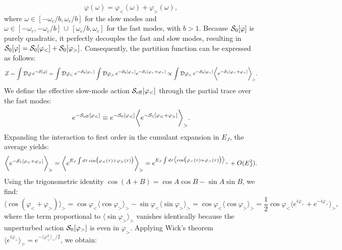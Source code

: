 \documentclass[aps,notitlepage,twocolumn,prl,nolongbibliography,superscriptaddress]{revtex4-2}
\begin{document}
\begin{equation}
    \varphi(\omega) = \varphi_<(\omega) + \varphi_>(\omega),
\end{equation}
where $\omega \in [-\omega_c/b, \omega_c/b]$ for the slow modes and $\omega \in [-\omega_c, -\omega_c/b]\, \cup \, [\omega_c/b, \omega_c]$ for the fast modes, with $b>1$.
Because ${\cal S}_0[\varphi]$ is purely quadratic, it perfectly decouples the fast and slow modes, resulting in ${\cal S}_0[\varphi] = {\cal S}_0[\varphi_<] + {\cal S}_0[\varphi_>]$. Consequently, the partition function can be expressed as follows:
\begin{equation}
    Z = \int {\cal D} \varphi \, e^{-{\cal S}[\varphi]} = \int {\cal D} \varphi_< \, e^{-{\cal S}_0[\varphi_<]} \int {\cal D} \varphi_> \, e^{-{\cal S}_0[\varphi_>]} e^{-{\cal S}_1[\varphi_< + \varphi_>]} \propto \int {\cal D} \varphi_< \, e^{-{\cal S}_0[\varphi_<]} \biggl \langle e^{-{\cal S}_1[\varphi_< + \varphi_>]} \biggr \rangle_>.
\end{equation}
We define the effective slow-mode action ${\cal S}_{\mathrm{eff}}[\varphi_<]$ through the partial trace over the fast modes:
\begin{equation}
     e^{-{\cal S}_{\mathrm{eff}}[\varphi_<]} \equiv e^{-{\cal S}_0[\varphi_<]} \biggl \langle e^{-{\cal S}_1[\varphi_< + \varphi_>]} \biggr \rangle_>.
\end{equation}
Expanding the interaction to first order in the cumulant expansion in $E_J$, the average yields:
\begin{equation}
      \biggl \langle e^{-{\cal S}_1[\varphi_< + \varphi_>]} \biggr \rangle_> = \biggl \langle e^{E_J\int d\tau \cos\bigl(\varphi_<(\tau) + \varphi_>(\tau)\bigr)}  \biggr \rangle_> = e^{E_J\int d\tau \bigl\langle\cos\bigl(\varphi_<(\tau) + \varphi_>(\tau)\bigr)\bigr \rangle_>} + O(E^2_J).
\end{equation}
Using the trigonometric identity $\cos(A+B) = \cos A\cos B - \sin A\sin B$, we find:
\begin{equation}
    \bigl \langle \cos(\varphi_< + \varphi_>)  \bigr \rangle_> = \cos \varphi_< \langle \cos\varphi_> \rangle_> - \sin \varphi_< \langle \sin\varphi_>   \rangle_> =  \cos \varphi_< \langle \cos\varphi_> \rangle_> = \frac{1}{2}\cos \varphi_< \biggl\langle e^{i\varphi_>} + e^{-i\varphi_>} \biggr \rangle_>,
\end{equation}
where the term proportional to $\langle \sin\varphi_> \rangle_>$ vanishes identically because the unperturbed action ${\cal S}_0[\varphi_>]$ is even in $\varphi_>$.
Applying Wick's theorem $\langle e^{i\varphi_>}\rangle_> = e^{-\langle\varphi^2_>\rangle_>/2}$, we obtain:
\end{document}
